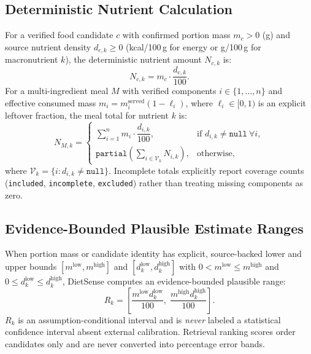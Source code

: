 \documentclass[conference]{IEEEtran}
\begin{document}
\subsection{Deterministic Nutrient Calculation}
For a verified food candidate $c$ with confirmed portion mass $m_c > 0$ (g) and source nutrient density $d_{c,k} \ge 0$ (kcal/100\,g for energy or g/100\,g for macronutrient $k$), the deterministic nutrient amount $N_{c,k}$ is:
\begin{equation}
N_{c,k} = m_c \cdot \frac{d_{c,k}}{100}.
\label{eq:scaling}
\end{equation}
For a multi-ingredient meal $M$ with verified components $i \in \{1, \dots, n\}$ and effective consumed mass $m_i = m_i^{\text{served}} (1 - \ell_i)$, where $\ell_i \in [0, 1)$ is an explicit leftover fraction, the meal total for nutrient $k$ is:
\begin{equation}
N_{M,k} =
\begin{cases}
\sum_{i=1}^{n} m_i \cdot \dfrac{d_{i,k}}{100}, & \text{if } d_{i,k} \neq \texttt{null}\ \forall i, \\[8pt]
\texttt{partial}\!\left(\sum_{i \in \mathcal{V}_k} N_{i,k}\right), & \text{otherwise},
\end{cases}
\label{eq:aggregation}
\end{equation}
where $\mathcal{V}_k = \{i : d_{i,k} \neq \texttt{null}\}$. Incomplete totals explicitly report coverage counts (\texttt{included}, \texttt{incomplete}, \texttt{excluded}) rather than treating missing components as zero.

\subsection{Evidence-Bounded Plausible Estimate Ranges}
When portion mass or candidate identity has explicit, source-backed lower and upper bounds $[m^{\text{low}}, m^{\text{high}}]$ and $[d_k^{\text{low}}, d_k^{\text{high}}]$ with $0 < m^{\text{low}} \le m^{\text{high}}$ and $0 \le d_k^{\text{low}} \le d_k^{\text{high}}$, DietSense computes an evidence-bounded plausible range:
\begin{equation}
R_k = \left[\frac{m^{\text{low}} d_k^{\text{low}}}{100},\; \frac{m^{\text{high}} d_k^{\text{high}}}{100}\right].
\label{eq:range}
\end{equation}
$R_k$ is an assumption-conditional interval and is \emph{never} labeled a statistical confidence interval absent external calibration. Retrieval ranking scores order candidates only and are never converted into percentage error bands.
\end{document}
